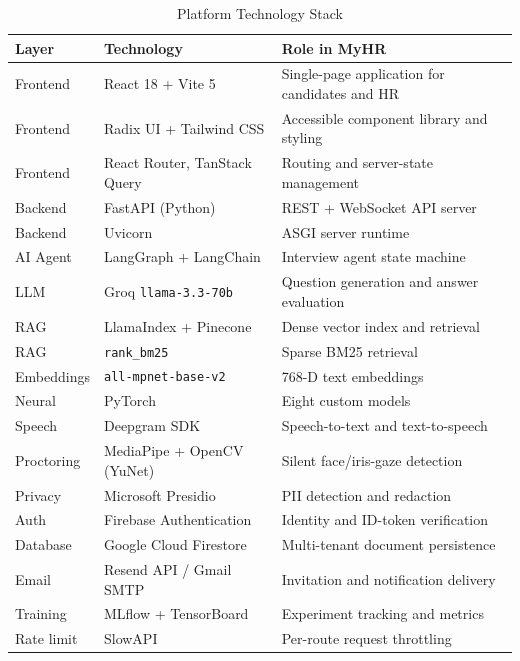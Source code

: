 \documentclass[12pt,a4paper,oneside]{report}
\begin{document}
\begin{table}[H]
\centering
\caption{Platform Technology Stack}
\label{tab:techstack}
\begin{tabularx}{\textwidth}{L{2.2cm}L{4.5cm}X}
\toprule
\textbf{Layer} & \textbf{Technology} & \textbf{Role in MyHR} \\
\midrule
Frontend   & React 18 + Vite 5              & Single-page application for candidates and HR \\
Frontend   & Radix UI + Tailwind CSS        & Accessible component library and styling \\
Frontend   & React Router, TanStack Query   & Routing and server-state management \\
Backend    & FastAPI (Python)               & REST + WebSocket API server \\
Backend    & Uvicorn                        & ASGI server runtime \\
AI Agent   & LangGraph + LangChain         & Interview agent state machine \\
LLM        & Groq \texttt{llama-3.3-70b}   & Question generation and answer evaluation \\
RAG        & LlamaIndex + Pinecone          & Dense vector index and retrieval \\
RAG        & \texttt{rank\_bm25}            & Sparse BM25 retrieval \\
Embeddings & \texttt{all-mpnet-base-v2}     & 768-D text embeddings \\
Neural     & PyTorch                        & Eight custom models \\
Speech     & Deepgram SDK                   & Speech-to-text and text-to-speech \\
Proctoring & MediaPipe + OpenCV (YuNet)     & Silent face/iris-gaze detection \\
Privacy    & Microsoft Presidio             & PII detection and redaction \\
Auth       & Firebase Authentication        & Identity and ID-token verification \\
Database   & Google Cloud Firestore         & Multi-tenant document persistence \\
Email      & Resend API / Gmail SMTP        & Invitation and notification delivery \\
Training   & MLflow + TensorBoard           & Experiment tracking and metrics \\
Rate limit & SlowAPI                        & Per-route request throttling \\
\bottomrule
\end{tabularx}
\end{table}
\end{document}
